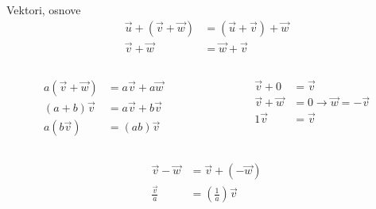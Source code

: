 \documentclass[9pt]{beamer}
\begin{document}
\begin{frame}{Vektori, osnove}
	\begin{align*}
	\vec{u} + (\vec{v} + \vec{w}) &= (\vec{u} + \vec{v}) + \vec{w} \\
	\vec{v} + \vec{w} &= \vec{w} + \vec{v}
	\end{align*}
	\begin{columns}[t]
		\begin{column}{0.4\textwidth}
			\begin{align*}
			a(\vec{v} + \vec{w}) &= a\vec{v} + a\vec{w} \\
			(a+b)\vec{v}  &= a\vec{v} + b\vec{v} \\
			a(b\vec{v})  &= (ab)\vec{v}
			\end{align*}
		\end{column}
	\begin{column}{0.4\textwidth}
		\begin{align*}
		\vec{v} + 0 &= \vec{v}\\
		\vec{v} + \vec{w} &= 0 \rightarrow \vec{w} = -\vec{v} \\
		1\vec{v} &= \vec{v}\\
		\end{align*}
	\end{column}
	\end{columns}
	\begin{align*}
		\vec{v} - \vec{w} &= \vec{v} + (-\vec{w}) \\
		\frac{\vec{v}}{a} &= \left(\frac{1}{a}\right)\vec{v}
	\end{align*}
\end{frame}
\end{document}
